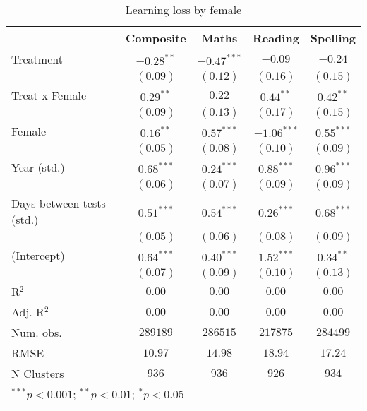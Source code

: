 
\begin{table}
\begin{center}
\begin{tabular}{l c c c c}
\hline
 & Composite & Maths & Reading & Spelling \\
\hline
Treatment                 & $-0.28^{**}$ & $-0.47^{***}$ & $-0.09$       & $-0.24$      \\
                          & $(0.09)$     & $(0.12)$      & $(0.16)$      & $(0.15)$     \\
Treat x Female            & $0.29^{**}$  & $0.22$        & $0.44^{**}$   & $0.42^{**}$  \\
                          & $(0.09)$     & $(0.13)$      & $(0.17)$      & $(0.15)$     \\
Female                    & $0.16^{**}$  & $0.57^{***}$  & $-1.06^{***}$ & $0.55^{***}$ \\
                          & $(0.05)$     & $(0.08)$      & $(0.10)$      & $(0.09)$     \\
Year (std.)               & $0.68^{***}$ & $0.24^{***}$  & $0.88^{***}$  & $0.96^{***}$ \\
                          & $(0.06)$     & $(0.07)$      & $(0.09)$      & $(0.09)$     \\
Days between tests (std.) & $0.51^{***}$ & $0.54^{***}$  & $0.26^{***}$  & $0.68^{***}$ \\
                          & $(0.05)$     & $(0.06)$      & $(0.08)$      & $(0.09)$     \\
(Intercept)               & $0.64^{***}$ & $0.40^{***}$  & $1.52^{***}$  & $0.34^{**}$  \\
                          & $(0.07)$     & $(0.09)$      & $(0.10)$      & $(0.13)$     \\
\hline
R$^2$                     & $0.00$       & $0.00$        & $0.00$        & $0.00$       \\
Adj. R$^2$                & $0.00$       & $0.00$        & $0.00$        & $0.00$       \\
Num. obs.                 & $289189$     & $286515$      & $217875$      & $284499$     \\
RMSE                      & $10.97$      & $14.98$       & $18.94$       & $17.24$      \\
N Clusters                & $936$        & $936$         & $926$         & $934$        \\
\hline
\multicolumn{5}{l}{\scriptsize{$^{***}p<0.001$; $^{**}p<0.01$; $^{*}p<0.05$}}
\end{tabular}
\caption{Learning loss by female}
\label{tablefemale}
\end{center}
\end{table}
